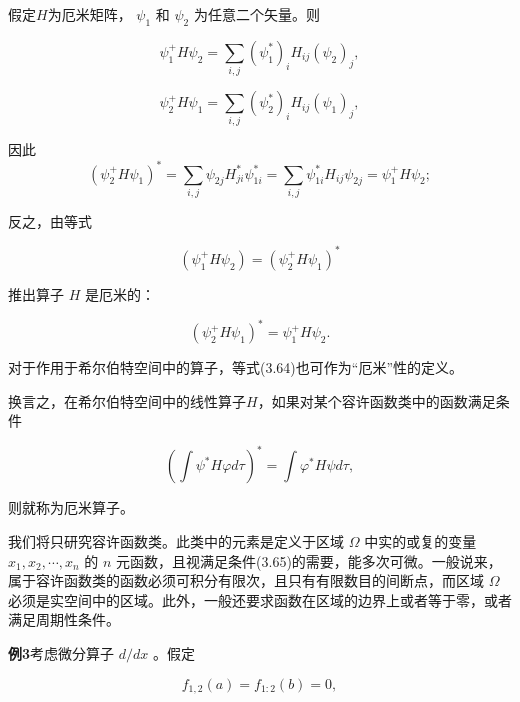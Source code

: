 假定$H$为厄米矩阵， $\psi_{1}$ 和 $\psi_{2}$ 为任意二个矢量。则

\begin{equation*}
\psi_ {1} ^ {+} H \psi_ {2} = \sum_ {i, j} (\psi_ {1} ^ {*}) _ {i} H _ {i j} (\psi_ {2}) _ {j},
\end{equation*}

\begin{equation*}
\psi_ {2} ^ {+} H \psi_ {1} = \sum_ {i, j} (\psi_ {2} ^ {*}) _ {i} H _ {i j} (\psi_ {1}) _ {j},
\end{equation*}

因此
\begin{equation*}
\left(\psi_ {2} ^ {+} H \psi_ {1}\right) ^ {*} = \sum_ {i, j} \psi_ {2 j} H _ {j i} ^ {*} \psi_ {1 i} ^ {*} = \sum_ {i, j} \psi_ {1 i} ^ {*} H _ {i j} \psi_ {2 j} = \psi_ {1} ^ {+} H \psi_ {2};
\end{equation*}

反之，由等式

\begin{equation*}
\left(\psi_ {1} ^ {+} H \psi_ {2}\right) = \left(\psi_ {2} ^ {+} H \psi_ {1}\right) ^ {*}
\end{equation*}

推出算子 $H$ 是厄米的：

\begin{equation*}
(\psi_ {2} ^ {+} H \psi_ {1}) ^ {*} = \psi_ {1} ^ {+} H \psi_ {2}.\tag{3.64}
\end{equation*}

对于作用于希尔伯特空间中的算子，等式(3.64)也可作为“厄米”性的定义。

换言之，在希尔伯特空间中的线性算子$H$，如果对某个容许函数类中的函数满足条件

\begin{equation*}
\left(\int \psi^ {*} H \varphi d \tau\right) ^ {*} = \int \varphi^ {*} H \psi d \tau ,\tag{3.65}
\end{equation*}

则就称为厄米算子。

我们将只研究容许函数类。此类中的元素是定义于区域 $\Omega$ 中实的或复的变量 $x_{1}, x_{2}, \cdots, x_{n}$ 的 $n$ 元函数，且视满足条件(3.65)的需要，能多次可微。一般说来，属于容许函数类的函数必须可积分有限次，且只有有限数目的间断点，而区域 $\Omega$ 必须是实空间中的区域。此外，一般还要求函数在区域的边界上或者等于零，或者满足周期性条件。

\textbf{例3}\quad 考虑微分算子 $d / dx$ 。假定

\begin{equation*}
f _ {1, 2} (a) = f _ {1: 2} (b) = 0,
\end{equation*}


